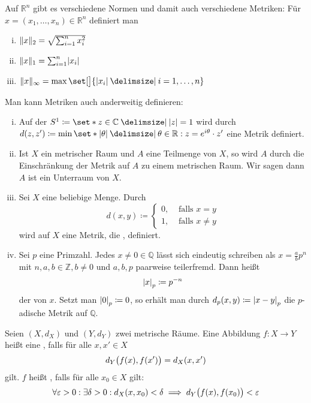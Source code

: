 \begin{beispiel}[{name=[Normen auf dem euklischen Raum]}]
	Auf $\mathbb{R}^n$ gibt es verschiedene Normen und damit auch verschiedene Metriken: 
	Für $x= (x_1, \ldots ,x_n) \in \mathbb{R}^n$ definiert man
	\begin{enumerate}[(i)]
		\item $\norm{x}_2 = \sqrt{\sum_{i=1}^{n} x_i^2}$
		\item $\norm{x}_1  = \sum_{i=1}^{n} \abs{x_i} $
		\item $\norm{x}_\infty = \max \set[\big]{\abs{x_i} \given i=1, \ldots , n}$
	\end{enumerate}
\end{beispiel}

\begin{beispiel}[{name=[Metriken verschiedenster Art]}]
	Man kann Metriken auch anderweitig definieren:
	\begin{enumerate}[(i)]
		\item Auf der  \(
			S^1 \coloneqq \set*{z \in \mathbb{C} \given \abs*{z} = 1} 
		\)
		wird durch $d(z,z') \coloneqq \min \set*{\abs*{\theta} \given \theta \in \mathbb{R} : z = e^{i \theta} \cdot z'} $ eine Metrik definiert.
		\item Ist $X$ ein metrischer Raum und $A$ eine Teilmenge von $X$, so wird $A$ durch die Einschränkung der Metrik auf $A$ zu einem metrischen Raum. 
		Wir sagen dann $A$ ist ein Unterraum von $X$.
		\item Sei $X$ eine beliebige Menge. Durch
		\[
			d(x,y) \coloneqq \begin{cases}
				0, &\text{ falls } x=y\\
				1, &\text{ falls } x \neq y
			\end{cases}
		\]
		wird auf $X$ eine Metrik, die , definiert.
		\item Sei $p$ eine Primzahl. 
		Jedes $x \neq 0 \in \mathbb{Q}$ lässt sich eindeutig schreiben als $x = \frac{a}{b} p^n$ mit $n,a,b \in \mathbb{Z}, b \neq 0$ und $a,b,p$ paarweise teilerfremd. 
		Dann heißt
		\[
			\abs*{x}_p \coloneqq p^{-n} 
		\]
		der  von $x$. 
		Setzt man $\abs*{0}_p \coloneqq 0 $, so erhält man durch $d_p(x,y) \coloneqq \abs*{x-y}_p $ die $p$-adische Metrik auf $\mathbb{Q}$. 
	\end{enumerate}
\end{beispiel}

\begin{definition}[{name=[Isometrie und Stetigkeit]}]
	Seien $(X,d_X)$ und $(Y,d_Y)$ zwei metrische Räume. 
	Eine Abbildung $f \colon X \to Y$ heißt eine , falls für alle $x,x' \in X$
	\[
		d_Y \enbrace[\big]{f(x), f(x')} = d_X (x,x')
	\]
	gilt.
	$f$ heißt , falls für alle $x_0 \in X$ gilt:
	\[
		\forall \varepsilon >0 : \exists \delta >0 : d_X(x,x_0) < \delta  \implies d_Y \enbrace[\big]{f(x), f(x_0)} < \varepsilon 
	\]
\end{definition}

